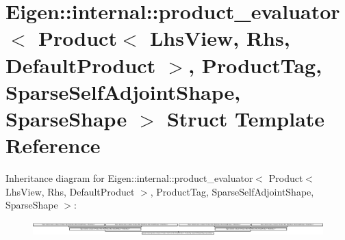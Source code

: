 \hypertarget{struct_eigen_1_1internal_1_1product__evaluator_3_01_product_3_01_lhs_view_00_01_rhs_00_01_defaul9695c5493cd4054bc6e3c91568225f16}{}\section{Eigen\+:\+:internal\+:\+:product\+\_\+evaluator$<$ Product$<$ Lhs\+View, Rhs, Default\+Product $>$, Product\+Tag, Sparse\+Self\+Adjoint\+Shape, Sparse\+Shape $>$ Struct Template Reference}
\label{struct_eigen_1_1internal_1_1product__evaluator_3_01_product_3_01_lhs_view_00_01_rhs_00_01_defaul9695c5493cd4054bc6e3c91568225f16}
Inheritance diagram for Eigen\+:\+:internal\+:\+:product\+\_\+evaluator$<$ Product$<$ Lhs\+View, Rhs, Default\+Product $>$, Product\+Tag, Sparse\+Self\+Adjoint\+Shape, Sparse\+Shape $>$\+:\begin{figure}[H]
\begin{center}
\leavevmode
\includegraphics[height=0.540541cm]{struct_eigen_1_1internal_1_1product__evaluator_3_01_product_3_01_lhs_view_00_01_rhs_00_01_defaul9695c5493cd4054bc6e3c91568225f16}
\end{center}
\end{figure}

